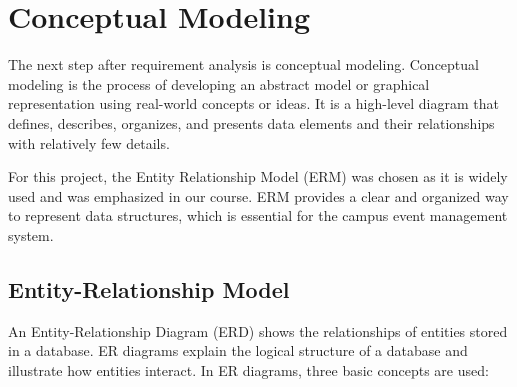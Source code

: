

\section{Conceptual Modeling}

The next step after requirement analysis is conceptual modeling. Conceptual modeling is the process of developing an abstract model or graphical representation using real-world concepts or ideas. It is a high-level diagram that defines, describes, organizes, and presents data elements and their relationships with relatively few details. 

For this project, the Entity Relationship Model (ERM) was chosen as it is widely used and was emphasized in our course. ERM provides a clear and organized way to represent data structures, which is essential for the campus event management system.

\subsection{Entity-Relationship Model}

An Entity-Relationship Diagram (ERD) shows the relationships of entities stored in a database. ER diagrams explain the logical structure of a database and illustrate how entities interact. In ER diagrams, three basic concepts are used:

